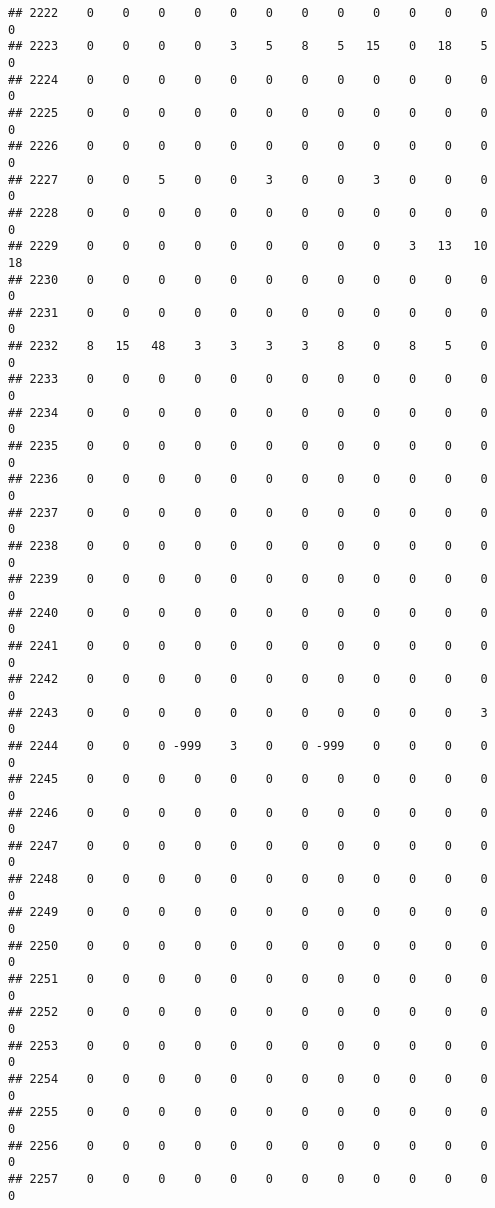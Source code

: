 \documentclass[]{article}
\begin{document}
\begin{verbatim}
## 2222    0    0    0    0    0    0    0    0    0    0    0    0    0
## 2223    0    0    0    0    3    5    8    5   15    0   18    5    0
## 2224    0    0    0    0    0    0    0    0    0    0    0    0    0
## 2225    0    0    0    0    0    0    0    0    0    0    0    0    0
## 2226    0    0    0    0    0    0    0    0    0    0    0    0    0
## 2227    0    0    5    0    0    3    0    0    3    0    0    0    0
## 2228    0    0    0    0    0    0    0    0    0    0    0    0    0
## 2229    0    0    0    0    0    0    0    0    0    3   13   10   18
## 2230    0    0    0    0    0    0    0    0    0    0    0    0    0
## 2231    0    0    0    0    0    0    0    0    0    0    0    0    0
## 2232    8   15   48    3    3    3    3    8    0    8    5    0    0
## 2233    0    0    0    0    0    0    0    0    0    0    0    0    0
## 2234    0    0    0    0    0    0    0    0    0    0    0    0    0
## 2235    0    0    0    0    0    0    0    0    0    0    0    0    0
## 2236    0    0    0    0    0    0    0    0    0    0    0    0    0
## 2237    0    0    0    0    0    0    0    0    0    0    0    0    0
## 2238    0    0    0    0    0    0    0    0    0    0    0    0    0
## 2239    0    0    0    0    0    0    0    0    0    0    0    0    0
## 2240    0    0    0    0    0    0    0    0    0    0    0    0    0
## 2241    0    0    0    0    0    0    0    0    0    0    0    0    0
## 2242    0    0    0    0    0    0    0    0    0    0    0    0    0
## 2243    0    0    0    0    0    0    0    0    0    0    0    3    0
## 2244    0    0    0 -999    3    0    0 -999    0    0    0    0    0
## 2245    0    0    0    0    0    0    0    0    0    0    0    0    0
## 2246    0    0    0    0    0    0    0    0    0    0    0    0    0
## 2247    0    0    0    0    0    0    0    0    0    0    0    0    0
## 2248    0    0    0    0    0    0    0    0    0    0    0    0    0
## 2249    0    0    0    0    0    0    0    0    0    0    0    0    0
## 2250    0    0    0    0    0    0    0    0    0    0    0    0    0
## 2251    0    0    0    0    0    0    0    0    0    0    0    0    0
## 2252    0    0    0    0    0    0    0    0    0    0    0    0    0
## 2253    0    0    0    0    0    0    0    0    0    0    0    0    0
## 2254    0    0    0    0    0    0    0    0    0    0    0    0    0
## 2255    0    0    0    0    0    0    0    0    0    0    0    0    0
## 2256    0    0    0    0    0    0    0    0    0    0    0    0    0
## 2257    0    0    0    0    0    0    0    0    0    0    0    0    0

\end{verbatim}
\end{document}
